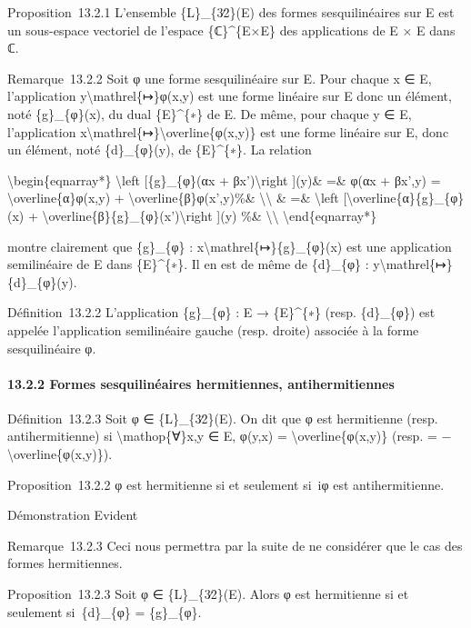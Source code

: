 \documentclass[]{article}
\begin{document}
Proposition~13.2.1 L'ensemble \{L\}\_\{3∕2\}(E) des formes
sesquilinéaires sur E est un sous-espace vectoriel de l'espace
\{ℂ\}\^{}\{E×E\} des applications de E × E dans ℂ.

Remarque~13.2.2 Soit φ une forme sesquilinéaire sur E. Pour chaque x ∈
E, l'application y\textbackslash{}mathrel\{↦\}φ(x,y) est une forme
linéaire sur E donc un élément, noté \{g\}\_\{φ\}(x), du dual
\{E\}\^{}\{∗\} de E. De même, pour chaque y ∈ E, l'application
x\textbackslash{}mathrel\{↦\}\textbackslash{}overline\{φ(x,y)\} est une
forme linéaire sur E, donc un élément, noté \{d\}\_\{φ\}(y), de
\{E\}\^{}\{∗\}. La relation

\textbackslash{}begin\{eqnarray*\} \textbackslash{}left
{[}\{g\}\_\{φ\}(αx + βx')\textbackslash{}right {]}(y)\& =\& φ(αx +
βx',y) = \textbackslash{}overline\{α\}φ(x,y) +
\textbackslash{}overline\{β\}φ(x',y)\%\&
\textbackslash{}\textbackslash{} \& =\& \textbackslash{}left
{[}\textbackslash{}overline\{α\}\{g\}\_\{φ\}(x) +
\textbackslash{}overline\{β\}\{g\}\_\{φ\}(x')\textbackslash{}right
{]}(y) \%\& \textbackslash{}\textbackslash{}
\textbackslash{}end\{eqnarray*\}

montre clairement que \{g\}\_\{φ\} :
x\textbackslash{}mathrel\{↦\}\{g\}\_\{φ\}(x) est une application
semilinéaire de E dans \{E\}\^{}\{∗\}. Il en est de même de \{d\}\_\{φ\}
: y\textbackslash{}mathrel\{↦\}\{d\}\_\{φ\}(y).

Définition~13.2.2 L'application \{g\}\_\{φ\} : E → \{E\}\^{}\{∗\} (resp.
\{d\}\_\{φ\}) est appelée l'application semilinéaire gauche (resp.
droite) associée à la forme sesquilinéaire φ.

\paragraph{13.2.2 Formes sesquilinéaires hermitiennes, antihermitiennes}

Définition~13.2.3 Soit φ ∈ \{L\}\_\{3∕2\}(E). On dit que φ est
hermitienne (resp. antihermitienne) si \textbackslash{}mathop\{∀\}x,y ∈
E, φ(y,x) = \textbackslash{}overline\{φ(x,y)\} (resp. =
−\textbackslash{}overline\{φ(x,y)\}).

Proposition~13.2.2 φ est hermitienne si et seulement si~iφ est
antihermitienne.

Démonstration Evident

Remarque~13.2.3 Ceci nous permettra par la suite de ne considérer que le
cas des formes hermitiennes.

Proposition~13.2.3 Soit φ ∈ \{L\}\_\{3∕2\}(E). Alors φ est hermitienne
si et seulement si~\{d\}\_\{φ\} = \{g\}\_\{φ\}.
\end{document}
